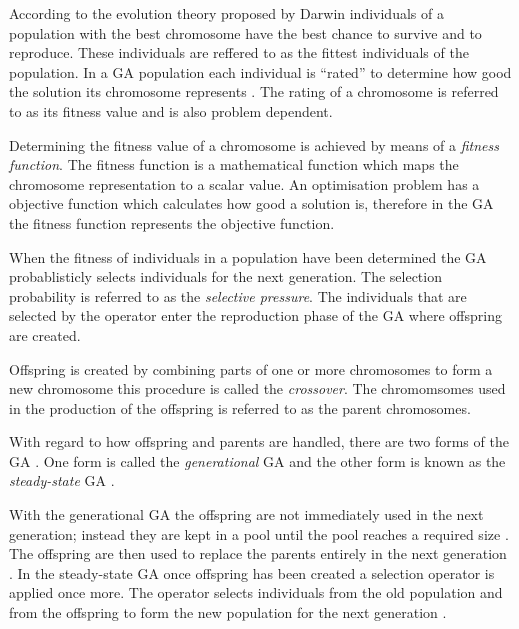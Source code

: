 According to the evolution theory proposed by Darwin individuals of a population with the best chromosome have the best chance to survive and to reproduce\cite{CompuIntelligenceIntro}. These individuals are reffered to as the fittest individuals of the population. In a GA population each individual is ``rated'' to determine how good the solution its chromosome represents \cite{CompuIntelligenceIntro}. The rating of a chromosome is referred to as its fitness value and is also problem dependent\cite{CompuIntelligenceIntro}.

Determining the fitness value of a chromosome is achieved by means of a \emph{fitness function}. The fitness function is a mathematical function which maps the chromosome representation to a scalar value\cite{CompuIntelligenceIntro}. An optimisation problem has a objective function which calculates how good a solution is, therefore in the GA the fitness function represents the objective function\cite{CompuIntelligenceIntro}.

When the fitness of individuals in a population have been determined the GA probablisticly selects individuals for the next generation\cite{CompuIntelligenceIntro}. The selection probability is referred to as the \emph{selective pressure}\cite{CompuIntelligenceIntro}. The individuals that are selected by the operator enter the reproduction phase of the GA where offspring are created\cite{CompuIntelligenceIntro}.

Offspring is created by combining parts of one or more chromosomes to form a new chromosome this procedure is called the \emph{crossover}\cite{CompuIntelligenceIntro}. The chromomsomes used in the production of the offspring is referred to as the parent chromosomes\cite{CompuIntelligenceIntro}.

With regard to how offspring and parents are handled, there are two forms of the GA \cite{FamilyGA}. One form is called the \emph{generational} GA  and the other form is known as the \emph{steady-state} GA \cite{GeostatisticalGA,FamilyGA}.

With the generational GA the offspring are not immediately used in the next generation; instead they are kept in a pool until the pool reaches a required size \cite{FamilyGA}. The offspring are then used to replace the parents entirely in the next generation \cite{FamilyGA}. In the steady-state GA once offspring has been created a selection operator is applied once more. The operator selects individuals from the old population and from the offspring to form the new population for the next generation \cite{GeostatisticalGA,FamilyGA}.

